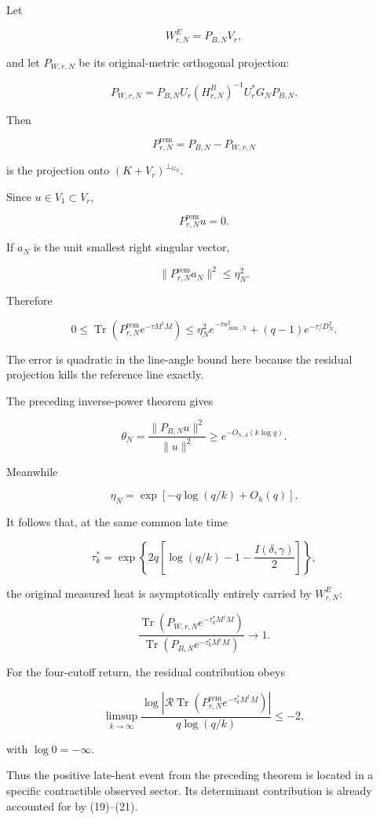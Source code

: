 \documentclass[11pt]{article}
\begin{document}
Let

\[
W^E_{r,N}=P_{B,N}V_r,
\]

and let \(P_{W,r,N}\) be its original-metric orthogonal projection:

\[
P_{W,r,N}
=
P_{B,N}U_r(H^B_{r,N})^{-1}U_r^*G_NP_{B,N}.
\]

Then

\[
P^{\mathrm{rem}}_{r,N}
=
P_{B,N}-P_{W,r,N}
\]

is the projection onto \((K+V_r)^{\perp_{G_N}}\).

Since \(u\in V_1\subset V_r\),

\[
P^{\mathrm{rem}}_{r,N}u=0.
\]

If \(a_N\) is the unit smallest right singular vector,

\[
\|P^{\mathrm{rem}}_{r,N}a_N\|^2\le\eta_N^2.
\]

Therefore

\[
\boxed{
0\le
\operatorname{Tr}\!\left(
P^{\mathrm{rem}}_{r,N}e^{-\tau M^\dagger M}
\right)
\le
\eta_N^2e^{-\tau s_{\min,N}^2}
+(q-1)e^{-\tau/D_N^2}.
}
\tag{35}
\]

The error is quadratic in the line-angle bound here because the residual projection kills the reference line exactly.

The preceding inverse-power theorem gives

\[
\theta_N=
\frac{\|P_{B,N}u\|^2}{\|u\|^2}
\ge e^{-O_{h,A}(k\log q)}.
\]

Meanwhile

\[
\eta_N=\exp[-q\log(q/k)+O_h(q)].
\]

It follows that, at the same common late time

\[
\tau_k^*
=
\exp\left\{
2q\left[\log(q/k)-1-\frac{I(\delta,\gamma)}2\right]
\right\},
\]

the original measured heat is asymptotically entirely carried by \(W^E_{r,N}\):

\[
\boxed{
\frac{
\operatorname{Tr}(P_{W,r,N}e^{-\tau_k^*M^\dagger M})
}{
\operatorname{Tr}(P_{B,N}e^{-\tau_k^*M^\dagger M})
}
\longrightarrow1.
}
\tag{36}
\]

For the four-cutoff return, the residual contribution obeys

\[
\boxed{
\limsup_{k\to\infty}
\frac{
\log\left|
\mathcal R\operatorname{Tr}
(P^{\mathrm{rem}}_{r,N}e^{-\tau_k^*M^\dagger M})
\right|
}{
q\log(q/k)
}
\le-2,
}
\tag{37}
\]

with \(\log0=-\infty\).

Thus the positive late-heat event from the preceding theorem is located in a specific contractible observed sector. Its determinant contribution is already accounted for by (19)--(21).
\end{document}

